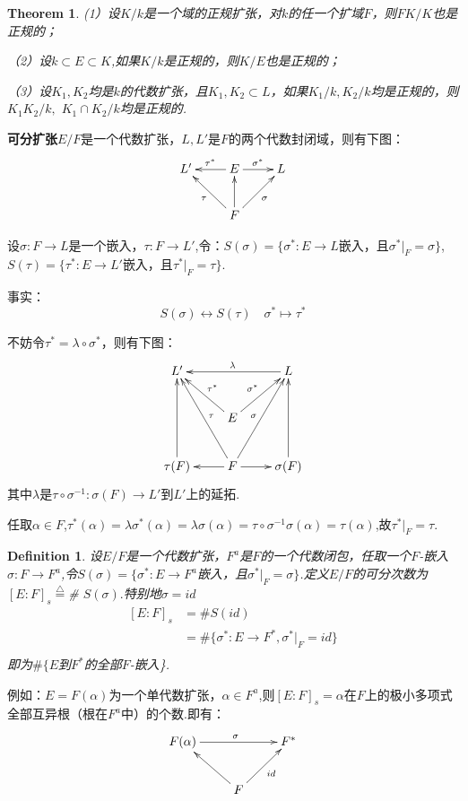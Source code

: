 \documentclass[UTF8]{article}
\newtheorem{thm}{Theorem}[section]
\newtheorem{defn}{Definition}[section]
\begin{document}
\begin{thm}
(1）设$K/k$是一个域的正规扩张，对$k$的任一个扩域$F$，则$FK/K$也是正规的；

（2）设$k\subset E\subset K$,如果$K/k$是正规的，则$K/E$也是正规的；

（3）设$K_1,K_2$均是$k$的代数扩张，且$K_1,K_2\subset L$，如果$K_1/k,K_2/k$均是正规的，则$K_1K_2/k,$ ${K_1\cap K_2}/k$均是正规的.
\end{thm}
\textbf{可分扩张}\quad$E/F$是一个代数扩张，$L,L'$是$F$的两个代数封闭域，则有下图：$$\xymatrix{L'&E\ar[l]_{\tau^*}\ar[r]^{\sigma^*}&L\\&F\ar[lu]^{\tau} \ar[u]\ar[ru]_{\sigma}&} $$

设$\sigma:F\rightarrow L$是一个嵌入，$\tau:F\rightarrow L'$,令：$S(\sigma)=\{\sigma^*:E\rightarrow L$嵌入，且$\sigma^*|_F=\sigma\}$,$S(\tau)=\{\tau^*:E\rightarrow L'$嵌入，且$\tau^*|_F=\tau\}$.

事实：$$S(\sigma)\longleftrightarrow S(\tau) \quad\sigma^*\longmapsto\tau^*$$

不妨令$\tau^*=\lambda\circ\sigma^*$，则有下图：$$\xymatrix{L'&&L\ar[ll]_{\lambda}\\&E\ar[lu]_{\tau^*} \ar[ru]^{\sigma^*}&\\ \tau(F)\ar[uu]&F\ar[l]\ar[luu]_{\tau}\ar[ruu]^{\sigma}\ar[r]&\sigma(F)\ar[uu]} $$其中$\lambda$是$\tau\circ\sigma^{-1}:\sigma(F)\rightarrow L'$到$L'$上的延拓.

任取$\alpha\in F$,$\tau^*(\alpha)=\lambda\sigma^*(\alpha)=\lambda\sigma(\alpha)=\tau\circ\sigma^{-1}\sigma(\alpha)=\tau(\alpha)$,故$\tau^*|_F=\tau$.

\begin{defn}
设$E/F$是一个代数扩张，$F^a$是$F$的一个代数闭包，任取一个$F$-嵌入$\sigma:F\rightarrow F^a$,令$S(\sigma)=\{\sigma^*:E\rightarrow F^a$嵌入，且$\sigma^*|_F=\sigma\}$.定义$E/F$的可分次数为$[E:F]_s\stackrel{\bigtriangleup}{=}$\# $S(\sigma).$特别地$\sigma=id$
\[
\begin{split}
[E:F]_s&=\# S(id)\\
&=\# \{\sigma^*:E\rightarrow F^*,\sigma^*|_F=id\}\\
\end{split}
\]
即为$\# \{E$到$F^*$的全部$F$-嵌入\}.
\end{defn} 
例如：$E=F(\alpha)$为一个单代数扩张，$\alpha\in F^a$,则$[E:F]_s=\alpha$在$F$上的极小多项式全部互异根（根在$F^a$中）的个数.即有：$$\xymatrix{F(\alpha)\ar[rr]^{\sigma}&&{F^*}\\& F\ar[lu] \ar[ru]_{id} & }$$
\end{document}
